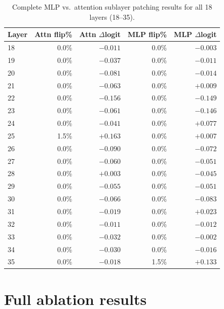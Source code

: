 \documentclass{article}
\begin{document}
\begin{table}[h]
\centering
\small
\caption{Complete MLP vs.\ attention sublayer patching results for all 18 layers (18--35).}
\label{tab:full_sublayer}
\begin{tabular}{lrrrr}
\toprule
\textbf{Layer} & \textbf{Attn flip\%} & \textbf{Attn $\Delta$logit} & \textbf{MLP flip\%} & \textbf{MLP $\Delta$logit} \\
\midrule
18 & 0.0\% & $-0.011$ & 0.0\% & $-0.003$ \\
19 & 0.0\% & $-0.037$ & 0.0\% & $-0.011$ \\
20 & 0.0\% & $-0.081$ & 0.0\% & $-0.014$ \\
21 & 0.0\% & $-0.063$ & 0.0\% & $+0.009$ \\
22 & 0.0\% & $-0.156$ & 0.0\% & $-0.149$ \\
23 & 0.0\% & $-0.061$ & 0.0\% & $-0.146$ \\
24 & 0.0\% & $-0.041$ & 0.0\% & $+0.077$ \\
25 & 1.5\% & $+0.163$ & 0.0\% & $+0.007$ \\
26 & 0.0\% & $-0.090$ & 0.0\% & $-0.072$ \\
27 & 0.0\% & $-0.060$ & 0.0\% & $-0.051$ \\
28 & 0.0\% & $+0.003$ & 0.0\% & $-0.045$ \\
29 & 0.0\% & $-0.055$ & 0.0\% & $-0.051$ \\
30 & 0.0\% & $-0.066$ & 0.0\% & $-0.083$ \\
31 & 0.0\% & $-0.019$ & 0.0\% & $+0.023$ \\
32 & 0.0\% & $-0.011$ & 0.0\% & $-0.012$ \\
33 & 0.0\% & $-0.032$ & 0.0\% & $-0.002$ \\
34 & 0.0\% & $-0.030$ & 0.0\% & $-0.016$ \\
35 & 0.0\% & $-0.018$ & 1.5\% & $+0.133$ \\
\bottomrule
\end{tabular}
\end{table}

\section{Full ablation results}
\label{app:ablation}
\end{document}
